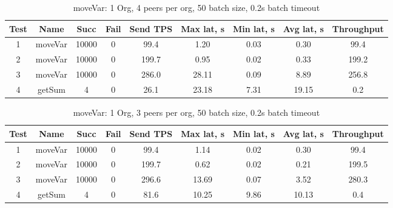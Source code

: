 \begin{appendices}
\begin{table}[H]
\begin{center}
\begin{tabular}{ |c|c|c|c|c|c|c|c|c| }
 \hline
  Test & Name & Succ  & Fail & Send TPS & Max lat, s & Min lat, s & Avg lat, s & Throughput \\
 \hline
 \hline
 1    & moveVar & 10000 & 0    & 99.4  & 1.20      & 0.03      & 0.30      & 99.4 \\
 \hline
 2    & moveVar & 10000 & 0    & 199.7 & 0.95      & 0.02      & 0.33      & 199.2 \\
 \hline
 3    & moveVar & 10000 & 0    & 286.0 & 28.11     & 0.09      & 8.89      & 256.8 \\
 \hline
 4    & getSum  & 4     & 0    & 26.1  & 23.18     & 7.31      & 19.15     & 0.2 \\
 \hline
\end{tabular}
\end{center}
\caption{moveVar: 1 Org, 4 peers per org, 50 batch size, 0.2s batch timeout}
\end{table}

\begin{table}[H]
\begin{center}
\begin{tabular}{ |c|c|c|c|c|c|c|c|c| }
 \hline
  Test & Name & Succ  & Fail & Send TPS & Max lat, s & Min lat, s & Avg lat, s & Throughput \\
 \hline
 \hline
 1    & moveVar & 10000 & 0    & 99.4  & 1.14      & 0.02      & 0.30      & 99.4  \\
 \hline
 2    & moveVar & 10000 & 0    & 199.7 & 0.62      & 0.02      & 0.21      & 199.5 \\
 \hline
 3    & moveVar & 10000 & 0    & 296.6 & 13.69     & 0.07      & 3.52      & 280.3 \\
 \hline
 4    & getSum  & 4     & 0    & 81.6  & 10.25     & 9.86      & 10.13     & 0.4   \\
 \hline
\end{tabular}
\end{center}
\caption{moveVar: 1 Org, 3 peers per org, 50 batch size, 0.2s batch timeout}
\end{table}


\end{appendices}
